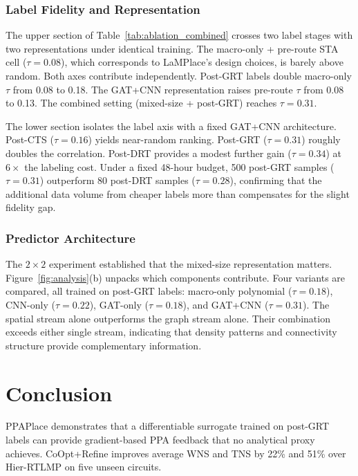 \documentclass[sigconf,anonymous,review,9pt]{acmart}
\begin{document}
\subsubsection{Label Fidelity and Representation}
\label{subsec:2x2}

The upper section of Table~\ref{tab:ablation_combined} crosses two
label stages with two representations under identical training. The macro-only + pre-route STA cell ($\tau = 0.08$), which
corresponds to LaMPlace's design choices, is barely above random. Both axes contribute
independently. Post-GRT labels double macro-only $\tau$ from 0.08 to
0.18. The GAT+CNN representation raises pre-route $\tau$ from 0.08 to
0.13. The combined setting (mixed-size + post-GRT) reaches
$\tau = 0.31$.

The lower section isolates the label axis with a fixed GAT+CNN
architecture. Post-CTS ($\tau = 0.16$) yields near-random ranking.
Post-GRT ($\tau = 0.31$) roughly doubles the correlation. Post-DRT
provides a modest further gain ($\tau = 0.34$) at $6\times$ the
labeling cost. Under a fixed 48-hour budget, 500 post-GRT samples
($\tau = 0.31$) outperform 80 post-DRT samples ($\tau = 0.28$),
confirming that the additional data volume from cheaper labels more
than compensates for the slight fidelity gap.

\subsubsection{Predictor Architecture}
\label{subsec:pred_results}

The $2 \times 2$ experiment established that the mixed-size
representation matters. Figure~\ref{fig:analysis}(b) unpacks which
components contribute. Four variants are compared, all trained on
post-GRT labels: macro-only polynomial ($\tau = 0.18$), CNN-only
($\tau = 0.22$), GAT-only ($\tau = 0.18$), and GAT+CNN
($\tau = 0.31$). The spatial stream alone outperforms the graph
stream alone. Their combination exceeds either single stream,
indicating that density patterns and connectivity structure provide
complementary information.


\section{Conclusion}
\label{sec:conclusion}

PPAPlace demonstrates that a differentiable surrogate trained on
post-GRT labels can provide gradient-based PPA feedback that no
analytical proxy achieves. CoOpt{+}Refine improves average WNS and
TNS by 22\% and 51\% over Hier-RTLMP on five unseen circuits.
\end{document}
